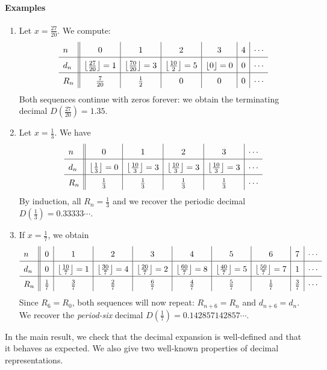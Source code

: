 \paragraph{Examples}
\begin{enumerate}
  \item Let $x=\frac{27}{20}$. We compute:
  \[\def\arraystretch{1.5}\begin{array}{l||c|c|c|c|c|c}
  n&0&1&2&3&4&\cdots\\\hline
  d_n&\left\lfloor\frac{27}{20}\right\rfloor=1 &\left\lfloor\frac{70}{20}\right\rfloor=3 &\left\lfloor\frac{10}{2}\right\rfloor=5 &\left\lfloor 0\right\rfloor=0 &0 &\cdots\\\hline
  R_n&\frac 7{20} &\frac{1}{2} &0 &0 &0&\cdots
  \end{array}\]
  Both sequences continue with zeros forever: we obtain the terminating decimal $D(\frac{27}{20})=1.35$.
	\item Let $x=\frac 13$. We have
	\[\def\arraystretch{1.5}\begin{array}{l||c|c|c|c|c}
  n&0&1&2&3&\cdots\\\hline
  d_n&\left\lfloor\frac{1}{3}\right\rfloor=0 &\left\lfloor\frac{10}3\right\rfloor=3 &\left\lfloor\frac{10}3\right\rfloor=3 &\left\lfloor\frac{10}3\right\rfloor=3 &\cdots\\\hline
  R_n&\frac 13 &\frac 13 &\frac 13 &\frac 13&\cdots
  \end{array}\]
  By induction, all $R_n=\frac 13$ and we recover the periodic decimal $D(\frac 13)=0.33333\cdots$.
  \item If $x=\frac 17$, we obtain
  \[\def\arraystretch{1.5}\begin{array}{l||c|c|c|c|c|c|c|c|c}
  n&0&1&2&3&4&5&6&7&\cdots\\\hline
  d_n&0&\left\lfloor\frac{10}7\right\rfloor=1 &\left\lfloor\frac{30}7\right\rfloor=4 &\left\lfloor\frac{20}7\right\rfloor=2 &\left\lfloor\frac{60}7\right\rfloor=8 &\left\lfloor\frac{40}7\right\rfloor=5 &\left\lfloor\frac{50}7\right\rfloor=7 &1 &\cdots\\\hline
  R_n&\frac 17 &\frac 37 &\frac 27 &\frac 67 &\frac 47 &\frac 57 &\frac 17 &\frac 37 &\cdots
  \end{array}\]
  Since $R_6=R_0$, both sequences will now repeat: $R_{n+6}=R_n$ and $d_{n+6}=d_n$. We recover the \emph{period-six} decimal $D(\frac 17)=0.142857142857\cdots$.
\end{enumerate}


\pagebreak

In the main result, we check that the decimal expansion is well-defined and that it behaves as expected. We also give two well-known properties of decimal representations.

